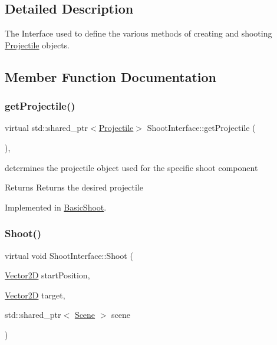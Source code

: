 \subsection{Detailed Description}
The Interface used to define the various methods of creating and shooting \hyperlink{class_projectile}{Projectile} objects. 

\subsection{Member Function Documentation}
\mbox{\label{class_shoot_interface_ad274b0c66a0a42bf194b32b704c8bfea}} 
\subsubsection{\texorpdfstring{get\+Projectile()}{getProjectile()}}
{\footnotesize\ttfamily virtual std\+::shared\+\_\+ptr$<$\hyperlink{class_projectile}{Projectile}$>$ Shoot\+Interface\+::get\+Projectile (\begin{DoxyParamCaption}{ }\end{DoxyParamCaption})\hspace{0.3cm}{\ttfamily [protected]}, {}}



determines the projectile object used for the specific shoot component 

\begin{DoxyReturn}{Returns}
Returns the desired projectile 
\end{DoxyReturn}


Implemented in \hyperlink{class_basic_shoot_ab5058d147ca9d9cc4cc4210e9e092de5}{Basic\+Shoot}.

\mbox{\label{class_shoot_interface_a67205cc4e2fed90fa8c1ec93b30b864d}} 
\subsubsection{\texorpdfstring{Shoot()}{Shoot()}}
{\footnotesize\ttfamily virtual void Shoot\+Interface\+::\+Shoot (\begin{DoxyParamCaption}\item[{\hyperlink{class_vector2_d}{Vector2D}}]{start\+Position,  }\item[{\hyperlink{class_vector2_d}{Vector2D}}]{target,  }\item[{std\+::shared\+\_\+ptr$<$ \hyperlink{class_scene}{Scene} $>$}]{scene }\end{DoxyParamCaption})\hspace{0.3cm}{\ttfamily [pure virtual]}}



